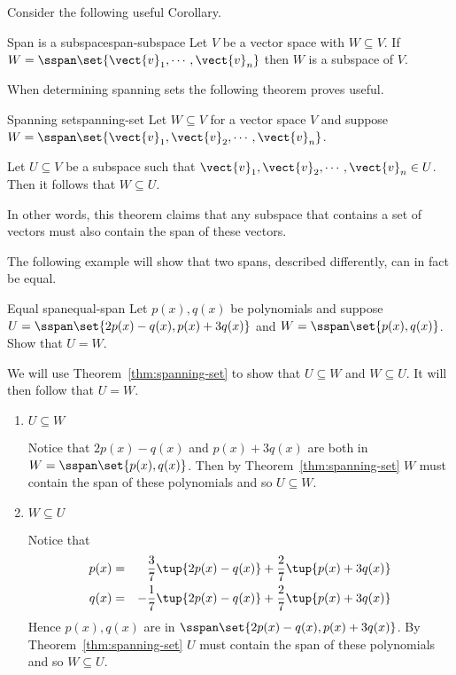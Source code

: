 Consider the following useful Corollary.

\begin{corollary}{Span is a subspace}{span-subspace}
Let $V$ be a vector space with $W \subseteq V$. If $W = \sspan \set{\vect{v}_1, \cdots,  \vect{v}_n }$ then $W$ is a subspace of $V$.
\end{corollary}

When determining spanning sets the following theorem proves useful.

\begin{theorem}{Spanning set}{spanning-set}
Let $W \subseteq V$ for a vector space $V$ and suppose $W = \sspan \set{\vect{v}_1, \vect{v}_2, \cdots, \vect{v}_n }$. 

Let $U \subseteq V$ be a subspace such that $\vect{v}_1, \vect{v}_2, \cdots, \vect{v}_n \in U$. Then it follows that $W \subseteq U$. 
\end{theorem}

In other words, this theorem claims that any subspace that contains a set of vectors must also contain the span of these vectors. 

The following example will show that two spans, described differently, can in fact be equal. 

\begin{example}{Equal span}{equal-span}
Let $p(x), q(x)$ be polynomials and suppose $U = \sspan\set{2p(x) - q(x), p(x) + 3q(x)} $ and $W =  \sspan\set{p(x), q(x) }$. Show that $U = W$. 
\end{example}

\begin{solution}
We will use Theorem~\ref{thm:spanning-set} to show that $U \subseteq W$ and $W \subseteq U$. It will then follow that $U=W$. 
\begin{enumerate}
\item $U \subseteq W$

Notice that $2p(x) - q(x)$ and $p(x) + 3q(x)$  are both in $W = \sspan \set{p(x), q(x) }$. Then by Theorem~\ref{thm:spanning-set} $W$ must contain the span of these polynomials and so $U \subseteq W$. 

\item $W \subseteq U$

Notice that 
\begin{eqnarray*}
p(x) &=& \frac{3}{7} \tup{2p(x) - q(x) }  + \frac{2}{7} \tup{p(x) + 3q(x)} \\
q(x) &=& -\frac{1}{7} \tup{2p(x) - q(x) }  + \frac{2}{7} \tup{p(x) + 3q(x)}
\end{eqnarray*}
Hence $p(x), q(x)$ are in $\sspan \set{2p(x) - q(x), p(x) + 3q(x) }$. By Theorem~\ref{thm:spanning-set} $U$ must contain the span of these polynomials and so $W \subseteq U$. 
\end{enumerate}
\end{solution}

